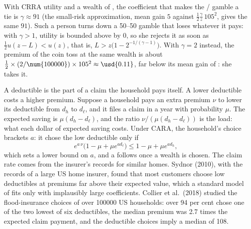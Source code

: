 \begin{example}\label{ex:b2:expected-utility:rabin-gamma}
With CRRA utility and a wealth of , the coefficient that makes the /
gamble a tie is $\gamma \approx 91$ (the small-risk approximation, mean gain $5$ against $\tfrac12
\tfrac{\gamma}{z}\,105^2$, gives the same $91$). Such a person turns down a 50--50 gamble that loses
 whatever it pays: with $\gamma > 1$, utility is bounded above by $0$, so she rejects it as
soon as $\tfrac12 u(z - L) < u(z)$, that is, $L > z\bigl(1 - 2^{-1/(\gamma - 1)}\bigr)$. With
$\gamma = 2$ instead, the premium of the coin toss at the same wealth is about $\tfrac12 \times
(2/\num{100000}) \times 105^2 \approx \usd{0.11}$, far below its mean gain of : she takes it.
\end{example}

\begin{measure}
A deductible is the part of a claim the household pays itself. A lower deductible costs a higher
premium. Suppose a household pays an extra premium $\nu$ to lower its deductible from $d_h$ to
$d_\ell$, and it files a claim in a year with probability $\mu$. The expected saving is $\mu(d_h -
d_\ell)$, and the ratio $\nu / (\mu(d_h - d_\ell))$ is the load: what each dollar of expected
saving costs. Under CARA, the household's choice brackets $a$: it chose the low deductible only if
\[
e^{a\,\nu}\bigl(1 - \mu + \mu e^{a d_\ell}\bigr) \le 1 - \mu + \mu e^{a d_h} ,
\]
which sets a lower bound on $a$, and a  follows once a wealth is
chosen. The claim rate comes from the insurer's records for similar homes. Sydnor (2010), with the
records of a large US home insurer, found that most customers choose low deductibles at premiums far
above their expected value, which a standard model of  fits only with implausibly large
coefficients.
Collier et al.\ (2018) studied the flood-insurance choices of over \num{100000} US households: over 94
per cent chose one of the two lowest of six deductibles, the median premium was 2.7 times the expected
claim payment, and the deductible choices imply a median  of 108.
\end{measure}

